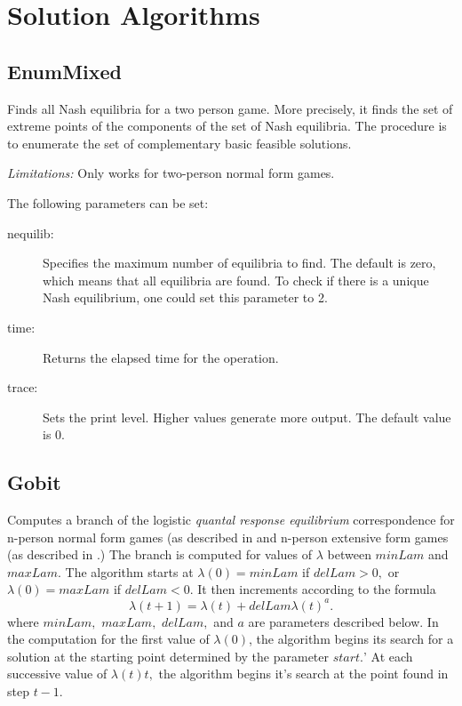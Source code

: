 \chapter{Solution Algorithms}\label{SolutionAlgorithms}

\section{EnumMixed}
Finds all Nash equilibria for a two person game.  More
precisely, it finds the set of extreme points of the components
of the set of Nash equilibria.  The procedure is to enumerate the set
of complementary basic feasible solutions.  

{\em Limitations:}  Only works for two-person normal form games. 

The following parameters can be set:

\begin{description}
\item[nequilib:] Specifies the maximum number of equilibria to find.  The
default is zero, which means that all equilibria are found.  To check if
there is a unique Nash equilibrium, one could set this parameter to 2.

\item[time:] Returns the elapsed time for the operation.

\item[trace:] Sets the print level.  Higher values generate more output.
The default value is 0.
\end{description}


\section{Gobit}
Computes a branch of the logistic {\em quantal response equilibrium}
correspondence for n-person normal form games (as described in
\cite{McKPal:95a}  and n-person extensive form games (as described
in \cite{McKPal:95b}.) The branch is computed
for values of $\lambda$ between $minLam$ and $maxLam.$  The algorithm
starts at $\lambda(0) = minLam$ if $delLam>0,$ or $\lambda(0) = maxLam$ if
$delLam<0$. It then increments according to the formula $$
\lambda(t+1) = \lambda(t) +delLam \lambda(t)^a.
$$ 
where $minLam,$ $maxLam,$ $delLam,$ and $a$ are
parameters described below. In the computation for the first value of
$\lambda(0)$, the algorithm begins its search for a solution at the
starting point determined by the parameter $start.$'  At each
successive value of $\lambda(t)t,$ the algorithm begins it's search at
the point found in step $t - 1.$  

